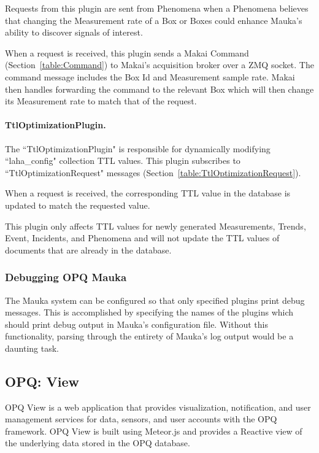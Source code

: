 Requests from this plugin are sent from Phenomena when a Phenomena believes that changing the Measurement rate of a Box or Boxes could enhance Mauka's ability to discover signals of interest.

When a request is received, this plugin sends a Makai Command (Section~\ref{table:Command}) to Makai's acquisition broker over a ZMQ socket. The command message includes the Box Id and Measurement sample rate. Makai then handles forwarding the command to the relevant Box which will then change its Measurement rate to match that of the request.

\paragraph{TtlOptimizationPlugin.}\label{subsubsec:ttl-optimization-pugin}

The ``TtlOptimizationPlugin" is responsible for dynamically modifying ``laha\_config" collection TTL values. This plugin subscribes to ``TtlOptimizationRequest" messages (Section~\ref{table:TtlOptimizationRequest}).

When a request is received, the corresponding TTL value in the database is updated to match the requested value.

This plugin only affects TTL values for newly generated Measurements, Trends, Event, Incidents, and Phenomena and will not update the TTL values of documents that are already in the database.

\subsubsection{Debugging OPQ Mauka}
The Mauka system can be configured so that only specified plugins print debug messages. This is accomplished by specifying the names of the plugins which should print debug output in Mauka's configuration file. Without this functionality, parsing through the entirety of Mauka's log output would be a daunting task.

\subsection{OPQ: View}\label{subsec:opq:-view}
OPQ View is a web application that provides visualization, notification, and user management services for data, sensors, and user accounts with the OPQ framework. OPQ View is built using Meteor.js and provides a Reactive view of the underlying data stored in the OPQ database.

